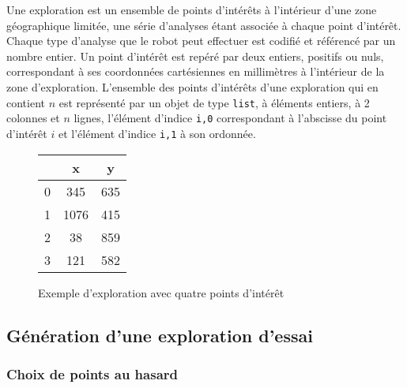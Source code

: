 Une exploration est un ensemble de points d’intérêts à l’intérieur d’une zone géographique limitée, une série
d’analyses étant associée à chaque point d’intérêt. Chaque type d’analyse que le robot peut effectuer est codifié
et référencé par un nombre entier. Un point d’intérêt est repéré par deux entiers, positifs ou nuls, correspondant
à ses coordonnées cartésiennes en millimètres à l’intérieur de la zone d’exploration. L’ensemble des points
d’intérêts d’une exploration qui en contient $n$ est représenté par un objet de type 
\texttt{list}, 
à éléments
entiers, à 2 colonnes et $n$ lignes, l’élément d’indice \texttt{i,0} correspondant à l’abscisse du point d’intérêt $i$ et l’élément
d’indice \texttt{i,1} à son ordonnée.

\begin{figure}[H]
\centering
\begin{tabular} {c||cc} 

 	& x 		& y     \\ \hline 
0 	& 345 	& 635 \\ %
1 	& 1076 	& 415 \\ %
2 	& 38 		& 859 \\ %
3 	& 121 	& 582 \\ %
\end{tabular}
\caption{Exemple d’exploration avec quatre points d’intérêt \label{fig_02}}
\end{figure}

\subsection{Génération d’une exploration d’essai}
\subsubsection{Choix de points au hasard}


